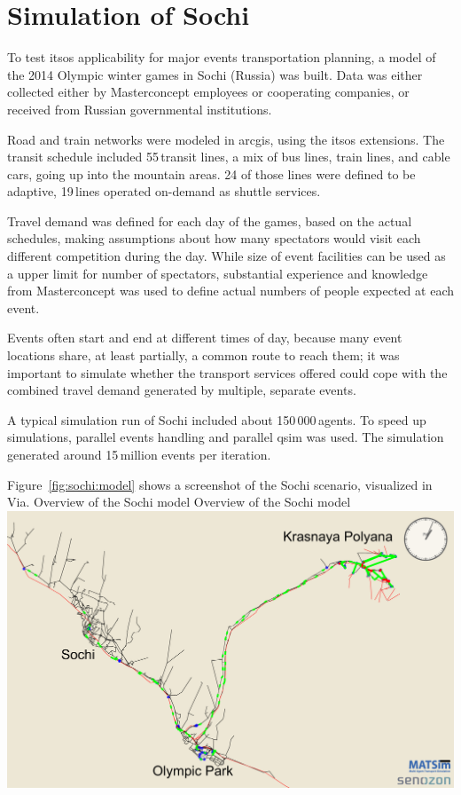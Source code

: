 \section{Simulation of Sochi}
To test \gls{itsos} applicability for major events transportation planning,
a model of the 2014 Olympic winter games in Sochi (Russia) was built. Data was
either collected either by Masterconcept employees or cooperating companies, or
received from Russian governmental institutions.

Road and train networks were modeled in \gls{arcgis}, using the \gls{itsos} extensions.
The transit schedule included 55\,transit lines, a mix of bus lines, train lines,
and cable cars, going up into the mountain areas. 24 of those lines were
defined to be adaptive, 19\,lines operated on-demand as shuttle services.

Travel demand was defined for each day of the games, based on the actual schedules,
making assumptions about how many spectators would visit each different
competition during the day. While size of event facilities can be used as a
upper limit for number of spectators, substantial experience and knowledge from
Masterconcept was used to define actual numbers of people expected at each
event.

Events often start and end at different times of day, because many event locations share, at least partially, a
common route to reach them; it was important to simulate whether the transport services offered could
cope with the combined travel demand generated by multiple, separate events.

A typical simulation run of Sochi included about 150\,000\,agents. To speed up simulations, parallel events handling and parallel qsim was used. The simulation generated around 15\,million events per iteration.

Figure~\ref{fig:sochi:model} shows a screenshot of the Sochi scenario, visualized in Via.
%
\createfigure%
{Overview of the Sochi model}%
{Overview of the Sochi model}%
{\label{fig:sochi:model}}%
{\includegraphics[width=1.\textwidth,angle=0]{./scenarios/figures/sochi_full.pdf}}%
{}
%

